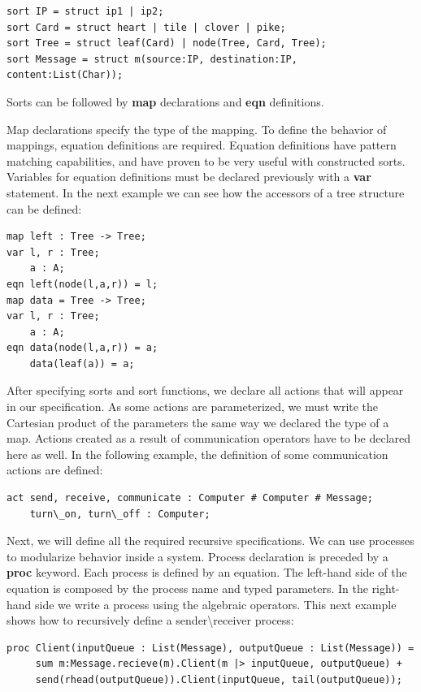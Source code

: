 \documentclass[11pt]{article}
\theoremstyle{definition}
\theoremstyle{plain}
\begin{document}
\begin{lstlisting}
sort IP = struct ip1 | ip2;
sort Card = struct heart | tile | clover | pike;
sort Tree = struct leaf(Card) | node(Tree, Card, Tree);
sort Message = struct m(source:IP, destination:IP, content:List(Char));
\end{lstlisting}

Sorts can be followed by \textbf{map} declarations and \textbf{eqn} definitions.

Map declarations specify the type of the mapping. To define the behavior of mappings, equation definitions are required. Equation definitions have pattern matching capabilities, and have proven to be very useful with constructed sorts. Variables for equation definitions must be declared previously with a \textbf{var} statement. In the next example we can see how the accessors of a tree structure can be defined:

\begin{lstlisting}
map left : Tree -> Tree;
var l, r : Tree;
    a : A;
eqn left(node(l,a,r)) = l;
map data = Tree -> Tree;
var l, r : Tree;
    a : A;
eqn data(node(l,a,r)) = a;
    data(leaf(a)) = a;
\end{lstlisting}


After specifying sorts and sort functions, we declare all actions that will appear in our specification. As some actions are parameterized, we must write the Cartesian product of the parameters the same way we declared the type of a map. Actions created as a result of communication operators have to be declared here as well. In the following example, the definition of some communication actions are defined:

\begin{lstlisting}
act send, receive, communicate : Computer # Computer # Message;
    turn\_on, turn\_off : Computer;
\end{lstlisting}

Next, we will define all the required recursive specifications. We can use processes to modularize behavior inside a system. Process declaration is preceded by a \textbf{proc} keyword. Each process is defined by an equation. The left-hand side of the equation is composed by the process name and typed parameters. In the right-hand side we write a process using the algebraic operators. This next example shows how to recursively define a sender\textbackslash receiver process:

\begin{lstlisting}
proc Client(inputQueue : List(Message), outputQueue : List(Message)) =
     sum m:Message.recieve(m).Client(m |> inputQueue, outputQueue) +
	 send(rhead(outputQueue)).Client(inputQueue, tail(outputQueue));
\end{lstlisting}
\end{document}
